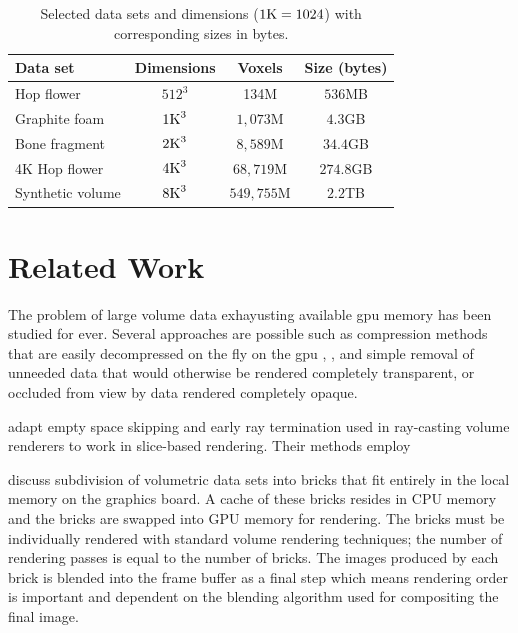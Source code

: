 \documentclass[journal]{vgtc}                %
\begin{document}
\begin{table}[h]
 	 \caption{Selected data sets and dimensions ($1\textnormal{K}=\nobreak1024$) 
	 	 	with corresponding sizes in bytes.}\label{table:targetedDataSets}
	 \scriptsize
	\begin{center}
		\begin{tabular}{lccc}
			\textbf{Data set} & \textbf{Dimensions} & \textbf{Voxels} & \textbf{Size} (bytes)\\
			\hline
			Hop flower & $512^3$ & 134M & $536$MB \\
			Graphite foam & $1\textnormal{K}^3$ & $1,073$M & $4.3$GB  \\
			Bone fragment & $2\textnormal{K}^3$ & $8,589$M & $34.4$GB  \\
			4K Hop flower & $4\textnormal{K}^3$ & $68,719$M & $274.8$GB \\
			Synthetic volume & $8\textnormal{K}^3$ & $549,755$M & $2.2$TB  \\
		\end{tabular}
	\end{center}
\end{table}

\section{Related Work}
The problem of large volume data exhayusting available gpu memory has been studied
for ever. Several approaches are possible such as compression methods that are easily
decompressed on the fly on the gpu \cite{Muraki1993}, \cite{Ihm1999}, and 
simple removal of unneeded data that would otherwise be rendered completely transparent, 
or occluded from view by data rendered completely opaque.

\cite{Li2003} adapt empty space skipping and early ray termination used in ray-casting volume renderers
to work in slice-based rendering. Their methods employ

\cite{Engel2004} discuss subdivision of volumetric data sets into bricks that
fit entirely in the local memory on the graphics board.  A cache of these
bricks resides in CPU memory and the bricks are swapped into GPU memory for
rendering. The bricks must be individually rendered with standard volume
rendering techniques; the number of rendering passes is equal to the number of
bricks.  The images produced by each brick is blended into the frame buffer as
a final step which means rendering order is important and dependent on 
the blending algorithm used for compositing the final image.  
\end{document}
